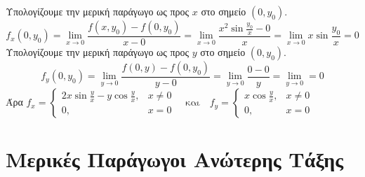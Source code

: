 \begin{examples}
\begin{enumerate}
\begin{solution}
\begin{myitemize}
                            Υπολογίζουμε την μερική παράγωγο ως προς $x$ στο σημείο 
                            $ (0, y_{0}) $.
                            \[
                                f_{x}(0, y_{0}) = \lim_{x \to 0} \frac{f(x, y_{0}) - 
                                    f(0, y_{0})}{x-0} = \lim_{x \to 0} \frac{x^{2} 
                                \sin{\frac{y_{0}}{x} - 0}}{x} = \lim_{x \to 0} x 
                                \sin{\frac{y_{0}}{x}} = 0 
                            \] 
                            Υπολογίζουμε την μερική παράγωγο ως προς $y$ στο σημείο 
                            $ (0, y_{0}) $.
                            \[
                                f_{y}(0, y_{0}) = \lim_{y \to 0} \frac{f(0,y)-
                                f(0, y_{0})}{y-0} = \lim_{y \to 0} \frac{0-0}{y} = 
                                \lim_{y \to 0} = 0 
                            \] 
                            Άρα $ f_{x}= 
                            \begin{cases}
                                2x \sin{\frac{y}{x}} - y \cos{\frac{y}{x}}, & x \neq 0 \\
                                0, & x = 0
                            \end{cases}
                            \quad \text{και} \quad f_{y} = 
                            \begin{cases}
                                x \cos{\frac{y}{x}}, & x \neq 0 \\
                                0, & x = 0
                            \end{cases} $  
                    \end{myitemize}
                \end{solution}
        \end{enumerate}
    \end{examples}

\section{Μερικές Παράγωγοι Ανώτερης Τάξης}

